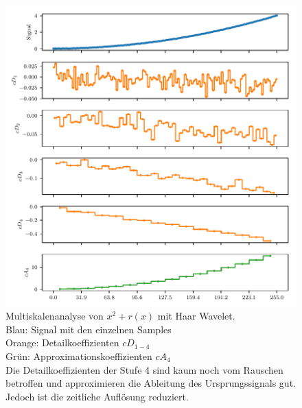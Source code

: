 \begin{refsection}
\begin{figure}
    \centering
    \includegraphics{papers/polynomials/images/polynomials_noise_db1_multi.pdf}
    \caption{Multiskalenanalyse von $x^2 + r(x)$ mit Haar Wavelet.\\
        Blau: Signal mit den einzelnen Samples\\
        Orange: Detailkoeffizienten $cD_{1-4}$ \\
        Grün: Approximationskoeffizienten $cA_4$\\
        Die Detailkoeffizienten der Stufe 4 sind kaum noch vom Rauschen
        betroffen und approximieren die Ableitung des Ursprungssignals gut.
        Jedoch ist die zeitliche Auflösung reduziert.\label{polynomials:noise:db1_multi}}
\end{figure}
\begin{figure}
    \centering

\end{figure}
\end{refsection}
